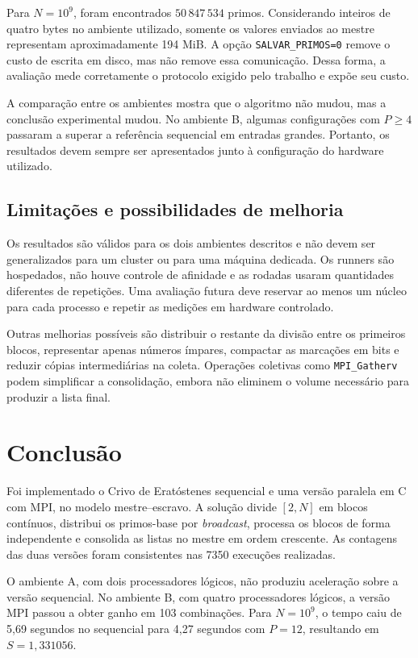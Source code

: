 \documentclass[12pt,a4paper]{article}
\begin{document}
Para $N=10^9$, foram encontrados $50\,847\,534$ primos. Considerando inteiros
de quatro bytes no ambiente utilizado, somente os valores enviados ao mestre
representam aproximadamente 194 MiB. A opção \texttt{SALVAR\_PRIMOS=0}
remove o custo de escrita em disco, mas não remove essa comunicação. Dessa
forma, a avaliação mede corretamente o protocolo exigido pelo trabalho e
expõe seu custo.

A comparação entre os ambientes mostra que o algoritmo não mudou, mas a
conclusão experimental mudou. No ambiente B, algumas configurações com
$P\geq4$ passaram a superar a referência sequencial em entradas grandes.
Portanto, os resultados devem sempre ser apresentados junto à configuração do
hardware utilizado.

\subsection{Limitações e possibilidades de melhoria}

Os resultados são válidos para os dois ambientes descritos e não devem ser
generalizados para um cluster ou para uma máquina dedicada. Os runners são
hospedados, não houve controle de afinidade e as rodadas usaram quantidades
diferentes de repetições. Uma avaliação futura deve reservar ao menos um
núcleo para cada processo e repetir as medições em hardware controlado.

Outras melhorias possíveis são distribuir o restante da divisão entre os
primeiros blocos, representar apenas números ímpares, compactar as marcações
em bits e reduzir cópias intermediárias na coleta. Operações coletivas como
\texttt{MPI\_Gatherv} podem simplificar a consolidação, embora não eliminem o
volume necessário para produzir a lista final.

\section{Conclusão}

Foi implementado o Crivo de Eratóstenes sequencial e uma versão paralela em C
com MPI, no modelo mestre--escravo. A solução divide $[2,N]$ em blocos
contínuos, distribui os primos-base por \textit{broadcast}, processa os blocos
de forma independente e consolida as listas no mestre em ordem crescente. As
contagens das duas versões foram consistentes nas 7350 execuções realizadas.

O ambiente A, com dois processadores lógicos, não produziu aceleração sobre a
versão sequencial. No ambiente B, com quatro processadores lógicos, a versão
MPI passou a obter ganho em 103 combinações. Para $N=10^9$, o tempo caiu de
5,69 segundos no sequencial para 4,27 segundos com $P=12$, resultando em
$S=1{,}331056$.
\end{document}
